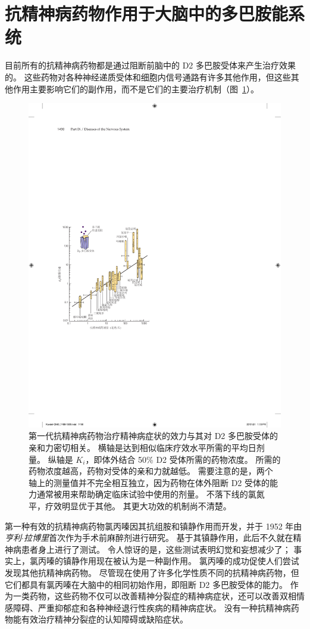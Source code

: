 \section{抗精神病药物作用于大脑中的多巴胺能系统}

目前所有的抗精神病药物都是通过阻断前脑中的 D2 多巴胺受体来产生治疗效果的。
这些药物对各种神经递质受体和细胞内信号通路有许多其他作用，但这些其他作用主要影响它们的副作用，而不是它们的主要治疗机制（图~\ref{fig:60_8}）。


\begin{figure}[htbp]
	\centering
	\includegraphics[width=0.68\linewidth]{chap60/fig_60_8}
	\caption{第一代抗精神病药物治疗精神病症状的效力与其对 D2 多巴胺受体的亲和力密切相关。
		横轴是达到相似临床疗效水平所需的平均日剂量。
		纵轴是 $ K_i $，即体外结合 50\% D2 受体所需的药物浓度。
		所需的药物浓度越高，药物对受体的亲和力就越低。
		需要注意的是，两个轴上的测量值并不完全相互独立，因为药物在体外阻断 D2 受体的能力通常被用来帮助确定临床试验中使用的剂量。
		不落下线的氯氮平，疗效明显优于其他。 其更大功效的机制尚不清楚\cite{seeman1976antipsychotic}。}
	\label{fig:60_8}
\end{figure}


第一种有效的抗精神病药物氯丙嗪因其抗组胺和镇静作用而开发，并于 1952 年由\textit{亨利$\cdot$拉博里}首次作为手术前麻醉剂进行研究。
基于其镇静作用，此后不久就在精神病患者身上进行了测试。
令人惊讶的是，这些测试表明幻觉和妄想减少了；
事实上，氯丙嗪的镇静作用现在被认为是一种副作用。
氯丙嗪的成功促使人们尝试发现其他抗精神病药物。
尽管现在使用了许多化学性质不同的抗精神病药物，但它们都具有氯丙嗪在大脑中的相同初始作用，即阻断 D2 多巴胺受体的能力。
作为一类药物，这些药物不仅可以改善精神分裂症的精神病症状，还可以改善双相情感障碍、严重抑郁症和各种神经退行性疾病的精神病症状。
没有一种抗精神病药物能有效治疗精神分裂症的认知障碍或缺陷症状。


